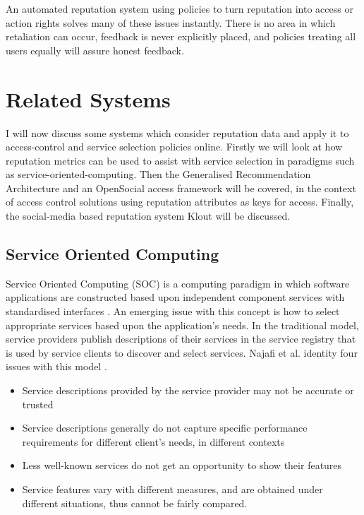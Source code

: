 An automated reputation system using policies to turn reputation into access or action rights solves many of these issues instantly. There is no area in which retaliation can occur, feedback is never explicitly placed, and policies treating all users equally will assure honest feedback.

\section{Related Systems}

I will now discuss some systems which consider reputation data and apply it to access-control and service selection policies online. Firstly we will look at how reputation metrics can be used to assist with service selection in paradigms such as service-oriented-computing. Then the Generalised Recommendation Architecture and an OpenSocial access framework will be covered, in the context of access control solutions using reputation attributes as keys for access. Finally, the social-media based reputation system Klout will be discussed. 


\subsection{Service Oriented Computing}

Service Oriented Computing (SOC) is a computing paradigm in which software applications are constructed based upon independent component services with standardised interfaces \cite{tsai2006introduction}. An emerging issue with this concept is how to select appropriate services based upon the application's needs. In the traditional model, service providers publish descriptions of their services in the service registry that is used by service clients to discover and select services. Najafi et al. identity four issues with this model \cite{najafi2012web}.

\begin{itemize}
 \item Service descriptions provided by the service provider may not be accurate or trusted
 \item Service descriptions generally do not capture specific performance requirements for different client's needs, in different contexts
 \item Less well-known services do not get an opportunity to show their features
 \item Service features vary with different measures, and are obtained under different situations, thus cannot be fairly compared. 
\end{itemize}

